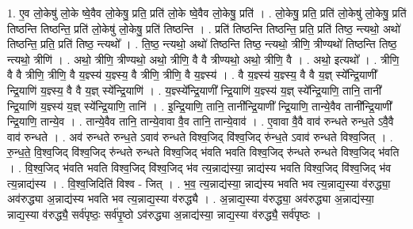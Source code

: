 \documentclass[17pt]{extarticle}
\begin{document}
1. ए॒व लो॒केषु॑ लो॒के ष्वे॒वैव लो॒केषु॒ प्रति॒ प्रति॑ लो॒के ष्वे॒वैव लो॒केषु॒ प्रति॑ । . लो॒केषु॒ प्रति॒ प्रति॑ लो॒केषु॑ लो॒केषु॒ प्रति॑ तिष्ठन्ति तिष्ठन्ति॒ प्रति॑ लो॒केषु॑ लो॒केषु॒ प्रति॑ तिष्ठन्ति । . प्रति॑ तिष्ठन्ति तिष्ठन्ति॒ प्रति॒ प्रति॑ तिष्ठ॒ न्त्यथो॒ अथो॑ तिष्ठन्ति॒ प्रति॒ प्रति॑ तिष्ठ॒ न्त्यथो᳚ । . ति॒ष्ठ॒ न्त्यथो॒ अथो॑ तिष्ठन्ति तिष्ठ॒ न्त्यथो॒ त्रीणि॒ त्रीण्यथो॑ तिष्ठन्ति तिष्ठ॒ न्त्यथो॒ त्रीणि॑ । . अथो॒ त्रीणि॒ त्रीण्यथो॒ अथो॒ त्रीणि॒ वै वै त्रीण्यथो॒ अथो॒ त्रीणि॒ वै । . अथो॒ इत्यथो᳚ । . त्रीणि॒ वै वै त्रीणि॒ त्रीणि॒ वै य॒ज्ञ्स्य॑ य॒ज्ञ्स्य॒ वै त्रीणि॒ त्रीणि॒ वै य॒ज्ञ्स्य॑ । . वै य॒ज्ञ्स्य॑ य॒ज्ञ्स्य॒ वै वै य॒ज्ञ् स्ये᳚न्द्रि॒याणी᳚ न्द्रि॒याणि॑ य॒ज्ञ्स्य॒ वै वै य॒ज्ञ् स्ये᳚न्द्रि॒याणि॑ । . य॒ज्ञ्स्ये᳚न्द्रि॒याणी᳚ न्द्रि॒याणि॑ य॒ज्ञ्स्य॑ य॒ज्ञ् स्ये᳚न्द्रि॒याणि॒ तानि॒ तानी᳚ न्द्रि॒याणि॑ य॒ज्ञ्स्य॑ य॒ज्ञ्
स्ये᳚न्द्रि॒याणि॒ तानि॑ । . इ॒न्द्रि॒याणि॒ तानि॒ तानी᳚न्द्रि॒याणी᳚ न्द्रि॒याणि॒ तान्ये॒वैव तानी᳚न्द्रि॒याणी᳚ न्द्रि॒याणि॒ तान्ये॒व । . तान्ये॒वैव तानि॒ तान्ये॒वावा वै॒व तानि॒ तान्ये॒वाव॑ । . ए॒वावा वै॒वै वाव॑ रुन्धते रुन्ध॒ते ऽवै॒वै वाव॑ रुन्धते । . अव॑ रुन्धते रुन्ध॒ते ऽवाव॑ रुन्धते विश्व॒जिद् वि॑श्व॒जिद् रु॑न्ध॒ते ऽवाव॑ रुन्धते विश्व॒जित् । . रु॒न्ध॒ते॒ वि॒श्व॒जिद् वि॑श्व॒जिद् रु॑न्धते रुन्धते विश्व॒जिद् भ॑वति भवति विश्व॒जिद् रु॑न्धते रुन्धते विश्व॒जिद् भ॑वति । . वि॒श्व॒जिद् भ॑वति भवति विश्व॒जिद् वि॑श्व॒जिद् भ॑व त्य॒न्नाद्य॑स्या॒ न्नाद्य॑स्य भवति विश्व॒जिद् वि॑श्व॒जिद् भ॑व त्य॒न्नाद्य॑स्य । . वि॒श्व॒जिदिति॑ विश्व - जित् । . भ॒व॒ त्य॒न्नाद्य॑स्या॒ न्नाद्य॑स्य भवति भव त्य॒न्नाद्य॒स्या व॑रुद्ध्या॒ अव॑रुद्ध्या अ॒न्नाद्य॑स्य भवति भव त्य॒न्नाद्य॒स्या व॑रुद्ध्यै । . अ॒न्नाद्य॒स्या व॑रुद्ध्या॒ अव॑रुद्ध्या अ॒न्नाद्य॑स्या॒ न्नाद्य॒स्या व॑रुद्ध्यै॒ सर्व॑पृष्ठः॒ सर्व॑पृ॒ष्ठो ऽव॑रुद्ध्या अ॒न्नाद्य॑स्या॒ न्नाद्य॒स्या व॑रुद्ध्यै॒ सर्व॑पृष्ठः । \newline
\end{document}
